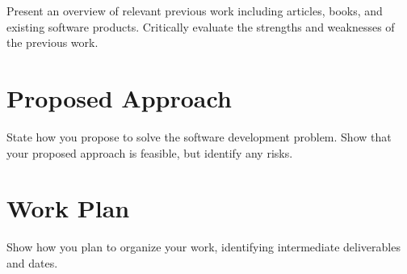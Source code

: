 \documentclass{proposal}
\begin{document}
    Present an overview of relevant previous work including articles, books, and existing software products.
    Critically evaluate the strengths and weaknesses of the previous work.




    \section{Proposed Approach}\label{sec:proposed-approach}

    State how you propose to solve the software development problem.
    Show that your proposed approach is feasible, but identify any risks.




    \section{Work Plan}\label{sec:work-plan}

    Show how you plan to organize your work, identifying intermediate deliverables and dates.




    
    
\end{document}
